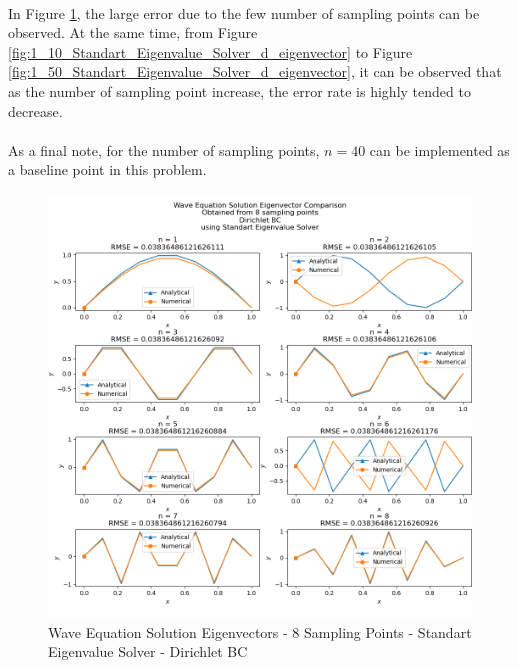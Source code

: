 \documentclass[letterpaper,12pt]{article}
\begin{document}
\paragraph{} In Figure \ref{fig:1_8_Standart_Eigenvalue_Solver_d_eigenvector}, the large error due to the few number of sampling points can be observed. At the same time, from Figure \ref{fig:1_10_Standart_Eigenvalue_Solver_d_eigenvector} to Figure \ref{fig:1_50_Standart_Eigenvalue_Solver_d_eigenvector}, it can be observed that as the number of sampling point increase, the error rate is highly tended to decrease. 

\paragraph{} As a final note, for the number of sampling points, $n = 40$ can be implemented as a baseline point in this problem.


\begin{figure}[H]
\centerline{\includegraphics[width=\linewidth]{figures/1_8_Standart_Eigenvalue_Solver_d_eigenvector.png}}
\caption{Wave Equation Solution Eigenvectors - 8 Sampling Points - Standart Eigenvalue Solver - Dirichlet BC}
\label{fig:1_8_Standart_Eigenvalue_Solver_d_eigenvector}
\end{figure}
\end{document}
